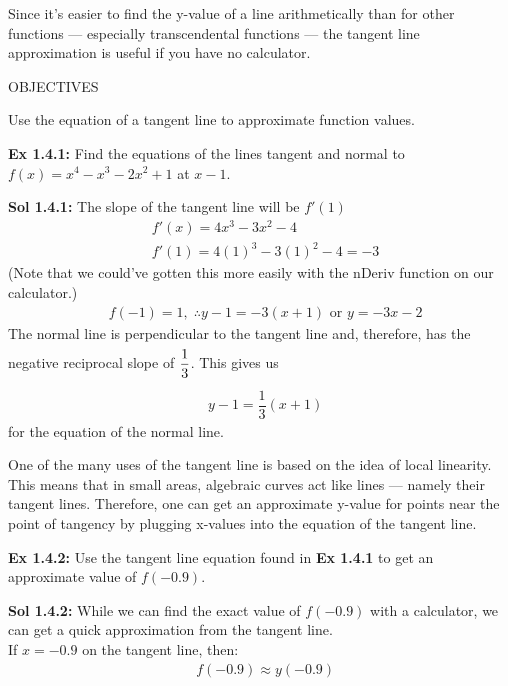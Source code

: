 Since it's easier to find the y-value of a line arithmetically than for other functions --- especially transcendental functions --- the tangent line approximation is useful if you have no calculator. \par

\begin{tcolorbox}[objective]
    \begin{center}
        OBJECTIVES \\[11pt]
    \end{center}
    Use the equation of a tangent line to approximate function values.
\end{tcolorbox}

\begin{tcolorbox}[example]
    \textbf{Ex 1.4.1: } Find the equations of the lines tangent and normal to $f(x) = x^4 - x^3 - 2x^2 + 1$ at $x - 1$. 
\end{tcolorbox}
\begin{tcolorbox}[solution]
    \textbf{Sol 1.4.1: } The slope of the tangent line will be $f'(1)$ \begin{align*}
        & f'(x) = 4x^3 - 3x^2 - 4 \\[11pt]
        & f'(1) = 4(1)^3 - 3(1)^2 - 4 = -3 
    \end{align*} 
    (Note that we could've gotten this more easily with the nDeriv function on our calculator.) \begin{align*}
        & f(-1) = 1, \; \therefore \boxed{y - 1 = -3(x + 1)} \text{ or } \boxed{y = -3x - 2} 
    \end{align*} 
    The normal line is perpendicular to the tangent line and, therefore, has the negative reciprocal slope of $\dfrac{1}{3} \forcespace$.  This gives us \begin{align*}
        & \boxed{y - 1 = \dfrac{1}{3}(x + 1)}
    \end{align*} for the equation of the normal line.
\end{tcolorbox}

One of the many uses of the tangent line is based on the idea of local linearity. This means that in small areas, algebraic curves act like lines --- namely their tangent lines. Therefore, one can get an approximate y-value for points near the point of tangency by plugging x-values into the equation of the tangent line. \par

\begin{tcolorbox}[example]
    \textbf{Ex 1.4.2: } Use the tangent line equation found in \textbf{Ex 1.4.1} to get an approximate value of $f(-0.9)$. 
\end{tcolorbox}
\begin{tcolorbox}[solution]
    \textbf{Sol 1.4.2: } While we can find the exact value of $f(-0.9)$ with a calculator, we can get a quick approximation from the tangent line. \\[11pt]
    If $x = -0.9$ on the tangent line, then: \begin{align*}
        & f(-0.9) \approx y(-0.9)
    \end{align*}
\end{tcolorbox}
